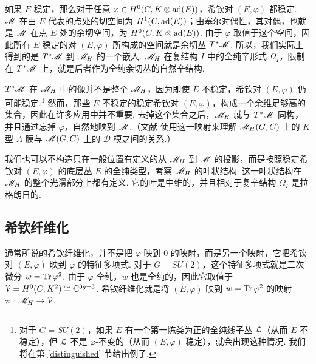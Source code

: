 如果 $E$ 稳定，那么对于任意 $\varphi\in H^0(C,K\otimes\ad(E))$，希钦对 $(E,\varphi)$ 都稳定. $\M$ 在由 $E$ 代表的点处的切空间为 $H^1(C,\ad(E))$；由塞尔对偶性，其对偶，也就是 $\M$ 在点 $E$ 处的余切空间，为 $H^0(C,K\otimes\ad(E))$. 由于 $\varphi$ 取值于这个空间，因此所有 $E$ 稳定的对 $(E,\varphi)$ 所构成的空间就是余切丛 $T^*\M$. 所以，我们实际上得到的是 $T^*\M$ 到 $\MH$ 的一个嵌入. $\MH$ 在复结构 $I$ 中的全纯辛形式 $\Omega_I$，限制在 $T^*\M$ 上，就是后者作为全纯余切丛的自然辛结构.

$T^*\M$ 在 $\MH$ 中的像并不是整个 $\MH$，因为即使 $E$ 不稳定，希钦对 $(E,\varphi)$ 仍可能稳定.\footnote{对于 $G=SU(2)$，如果 $E$ 有一个第一陈类为正的全纯线子丛 ${\cal L}$（从而 $E$ 不稳定），但 ${\cal L}$ 不是 $\varphi$-不变的（从而 $(E,\varphi)$ 稳定），就会出现这种情况. 我们将在第 \ref{distinguished} 节给出例子.} 然而，那些 $E$ 不稳定的稳定希钦对 $(E,\varphi)$，构成一个余维足够高的集合，因此在许多应用中并不重要. 去掉这个集合之后，$\MH$ 就与 $T^*\M$ 同构，并且通过忘掉 $\varphi$，自然地映到 $\M$.（文献 \cite{KW} 使用这一映射来理解 $\MH(G,C)$ 上的 $K$ 型 $A$-膜与 $\M(G,C)$ 上的 $\mathcal D$-模之间的关系.）

我们也可以不构造只在一般位置有定义的从 $\MH$ 到 $\M$ 的投影，而是按照稳定希钦对 $(E,\varphi)$ 的底层丛 $E$ 的全纯类型，考察 $\MH$ 的叶状结构. 这一叶状结构在 $\MH$ 的整个光滑部分上都有定义. 它的叶是中维的，并且相对于复辛结构 $\Omega_I$ 是拉格朗日的.

\subsection{希钦纤维化}
\label{hitchfibr}

\def\calP{{\mathcal P}}
通常所说的希钦纤维化，并不是把 $\varphi$ 映到 0 的映射，而是另一个映射，它把希钦对 $(E,\varphi)$ 映到 $\varphi$ 的特征多项式. 对于 $G=SU(2)$，这个特征多项式就是二次微分 $w=\Tr\,\varphi^2$. 由于 $\varphi$ 全纯，$w$ 也是全纯的，因此它取值于 ${\cal V}=H^0(C,K^2)\cong \Bbb{C}^{3g-3}$. 希钦纤维化就是将 $(E,\varphi)$ 映到 $w=\Tr\,\varphi^2$ 的映射 $\ppi:\MH\to {\cal V}$.

